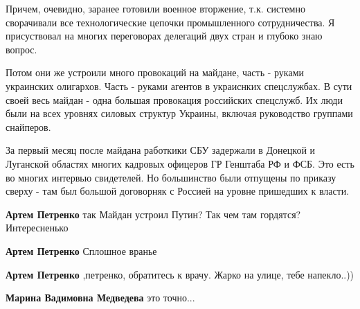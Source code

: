\begin{itemize}
\begin{itemize}
Причем, очевидно, заранее готовили военное вторжение, т.к. системно сворачивали
все технологические цепочки промышленного сотрудничества. Я присуствовал на
многих переговорах делегаций двух стран и глубоко знаю вопрос.

Потом они же устроили много провокаций на майдане, часть - руками украинских
олигархов. Часть - руками агентов в украиснких спецслужбах. В сути своей весь
майдан - одна большая провокация российских спецслужб. Их люди были на всех
уровнях силовых структур Украины, включая руководство группами снайперов.

За первый месяц после майдана работкики СБУ задержали в Донецкой и Луганской
областях многих кадровых офицеров ГР Генштаба РФ и ФСБ. Это есть во многих
интервью свидетелей. Но большинство были отпущены по приказу сверху - там был
большой договорняк с Россией на уровне пришедших к власти.


 
\textbf{Артем Петренко} так Майдан устроил Путин? Так чем там гордятся? Интересненько 🤨

 
\textbf{Артем Петренко} Сплошное вранье

 
\textbf{Артем Петренко} ,петренко, обратитесь к врачу. Жарко на улице, тебе напекло..))

 
\textbf{Марина Вадимовна Медведева} это точно...



\end{itemize}
\end{itemize}
